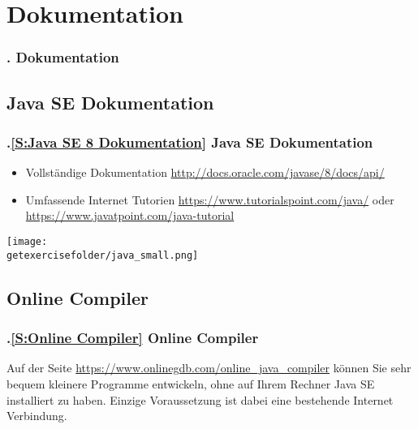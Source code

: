 \AtBeginSection{}
\section{Dokumentation}
\begin{frame}
  \frametitle{\kap. Dokumentation}%
\tableofcontents[current]
\end{frame}


\def\stitle{Java SE Dokumentation}%
\subsection*{\stitle}\label{S:Java SE 8 Dokumentation}
\begin{frame}[t]%
  \frametitle{\kap.\ref{S:Java SE 8 Dokumentation} \stitle}%
\medskip

\begin{itemize}
\item Vollständige Dokumentation \textcolor{KITblue}{\url{http://docs.oracle.com/javase/8/docs/api/}}
\item Umfassende Internet Tutorien \textcolor{KITblue}{\url{https://www.tutorialspoint.com/java/}} oder \textcolor{KITblue}{\url{https://www.javatpoint.com/java-tutorial}}
\end{itemize}
\medskip

\texttt{[image: \\getexercisefolder/java\_small.png]}
\end{frame}


\def\stitle{Online Compiler}%
\subsection*{\stitle}\label{S:Online Compiler}
\begin{frame}[t]%
  \frametitle{\kap.\ref{S:Online Compiler} \stitle}%
\medskip

Auf der Seite \textcolor{KITblue}{\url{https://www.onlinegdb.com/online_java_compiler}} können Sie sehr bequem kleinere Programme entwickeln, ohne auf Ihrem Rechner Java SE installiert zu haben.
Einzige Voraussetzung ist dabei eine bestehende Internet Verbindung.
\end{frame}
